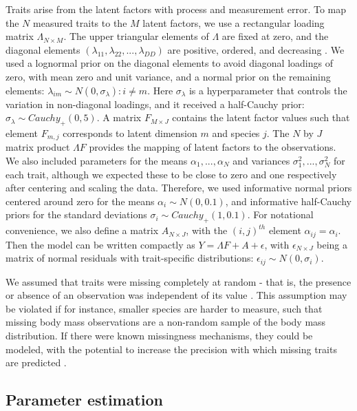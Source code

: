 Traits arise from the latent factors with process and measurement error.
To map the $N$ measured traits to the $M$ latent factors, we use a rectangular loading matrix $\Lambda_{N \times M}$.
The upper triangular elements of $\Lambda$ are fixed at zero, and the diagonal elements $(\lambda_{11}, \lambda_{22}, ..., \lambda_{DD})$ are positive, ordered, and decreasing \citep{West2003, Conti2014a}.
We used a lognormal prior on the diagonal elements to avoid diagonal loadings of zero, with mean zero and unit variance, and a normal prior on the remaining elements: $\lambda_{im} \sim N(0, \sigma_\lambda): i \neq m$.
Here $\sigma_\lambda$ is a hyperparameter that controls the variation in non-diagonal loadings, and it received a half-Cauchy prior: $\sigma_\lambda \sim Cauchy_{+} (0, 5)$.
A matrix $F_{M \times J}$ contains the latent factor values such that element $F_{m, j}$ corresponds to latent dimension $m$ and species $j$.
The $N$ by $J$ matrix product $\Lambda F$ provides the mapping of latent factors to the observations.
We also included parameters for the means $\alpha_1, ..., \alpha_N$ and variances $\sigma^2_1, ..., \sigma^2_N$ for each trait, although we expected these to be close to zero and one respectively after centering and scaling the data.
Therefore, we used informative normal priors centered around zero for the means $\alpha_i \sim N(0, 0.1)$, and informative half-Cauchy priors for the standard deviations $\sigma_i \sim Cauchy_{+} (1, 0.1)$.
For notational convenience, we also define a matrix $A_{N \times J}$, with the $(i, j)^{th}$ element $\alpha_{ij} = \alpha_i$.
Then the model can be written compactly as $Y = \Lambda F + A + \epsilon$, with $\epsilon_{N \times J}$ being a matrix of normal residuals with trait-specific distributions: $\epsilon_{ij} \sim N(0, \sigma_i)$.

We assumed that traits were missing completely at random - that is, the presence or absence of an observation was independent of its value \citep{little2014statistical}.
This assumption may be violated if for instance, smaller species are harder to measure, such that missing body mass observations are a non-random sample of the body mass distribution.
If there were known missingness mechanisms, they could be modeled, with the potential to increase the precision with which missing traits are predicted \citep{Reich2010}.

\subsection{Parameter estimation}

